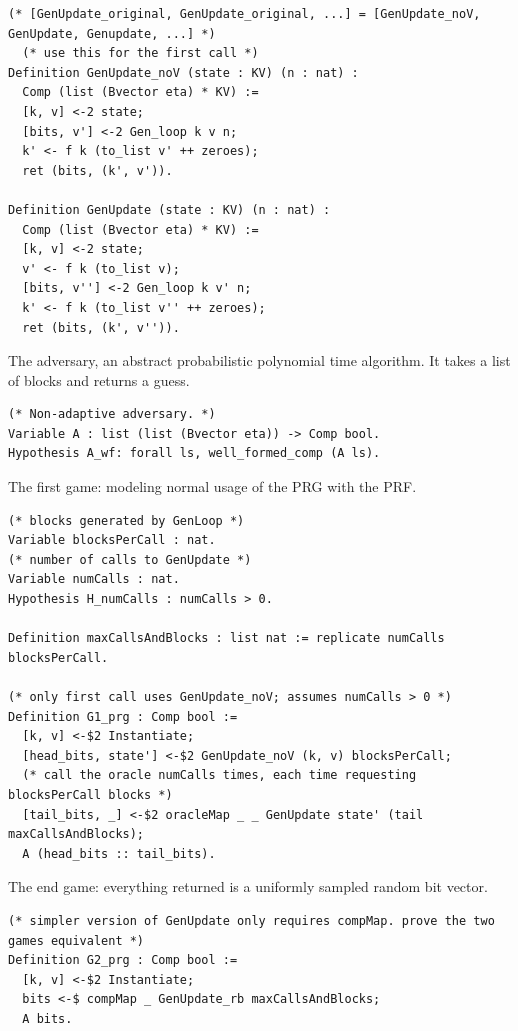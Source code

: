 \documentclass[12pt,lot, lof]{puthesis}
\begin{document}
{\begin{lstlisting}
(* [GenUpdate_original, GenUpdate_original, ...] = [GenUpdate_noV, GenUpdate, Genupdate, ...] *)
  (* use this for the first call *)
Definition GenUpdate_noV (state : KV) (n : nat) :
  Comp (list (Bvector eta) * KV) :=
  [k, v] <-2 state;
  [bits, v'] <-2 Gen_loop k v n;
  k' <- f k (to_list v' ++ zeroes);
  ret (bits, (k', v')).

Definition GenUpdate (state : KV) (n : nat) :
  Comp (list (Bvector eta) * KV) :=
  [k, v] <-2 state;
  v' <- f k (to_list v);
  [bits, v''] <-2 Gen_loop k v' n;
  k' <- f k (to_list v'' ++ zeroes);
  ret (bits, (k', v'')).
\end{lstlisting}

The adversary, an abstract probabilistic polynomial time algorithm. It takes a list of blocks and returns a guess.

\begin{lstlisting}
(* Non-adaptive adversary. *)
Variable A : list (list (Bvector eta)) -> Comp bool.
Hypothesis A_wf: forall ls, well_formed_comp (A ls).
\end{lstlisting}

The first game: modeling normal usage of the PRG with the PRF.

\begin{lstlisting}
(* blocks generated by GenLoop *)
Variable blocksPerCall : nat.      
(* number of calls to GenUpdate *) 
Variable numCalls : nat.        
Hypothesis H_numCalls : numCalls > 0. 

Definition maxCallsAndBlocks : list nat := replicate numCalls blocksPerCall.

(* only first call uses GenUpdate_noV; assumes numCalls > 0 *)
Definition G1_prg : Comp bool :=
  [k, v] <-$2 Instantiate;
  [head_bits, state'] <-$2 GenUpdate_noV (k, v) blocksPerCall;
  (* call the oracle numCalls times, each time requesting blocksPerCall blocks *)
  [tail_bits, _] <-$2 oracleMap _ _ GenUpdate state' (tail maxCallsAndBlocks);
  A (head_bits :: tail_bits).
\end{lstlisting}

The end game: everything returned is a uniformly sampled random bit vector.

\begin{lstlisting}
(* simpler version of GenUpdate only requires compMap. prove the two games equivalent *)
Definition G2_prg : Comp bool :=
  [k, v] <-$2 Instantiate;
  bits <-$ compMap _ GenUpdate_rb maxCallsAndBlocks;
  A bits.
\end{lstlisting}

}
\end{document}
